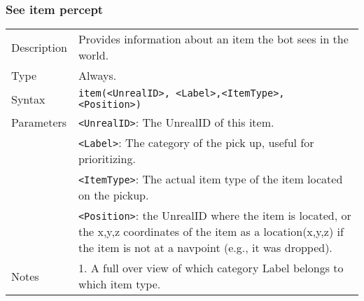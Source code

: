 \documentclass[11pt,a4paper]{article}
\begin{document}
\subsubsection*{See item percept}
\begin{small}
\begin{tabular}{p{2cm}p{9cm}}
Description & Provides information about an item the bot sees in the world.\\
Type & Always.\\
Syntax & \verb|item(<UnrealID>, <Label>,<ItemType>, <Position>)|\\ 
Parameters &
\verb|<UnrealID>|: The UnrealID of this item.\\
& \verb|<Label>|: The category of the pick up, useful for prioritizing.\\
& \verb|<ItemType>|: The actual item type of the item located on the pickup. \\
& \verb|<Position>|: the UnrealID where the item is located, or the x,y,z coordinates of the item as a location(x,y,z) if the item is not at a navpoint (e.g., it was dropped).\\
Notes &
	1.	A full over view of which category Label belongs to which item type.
\end{tabular}
\end{small}
\\\\
\end{document}
